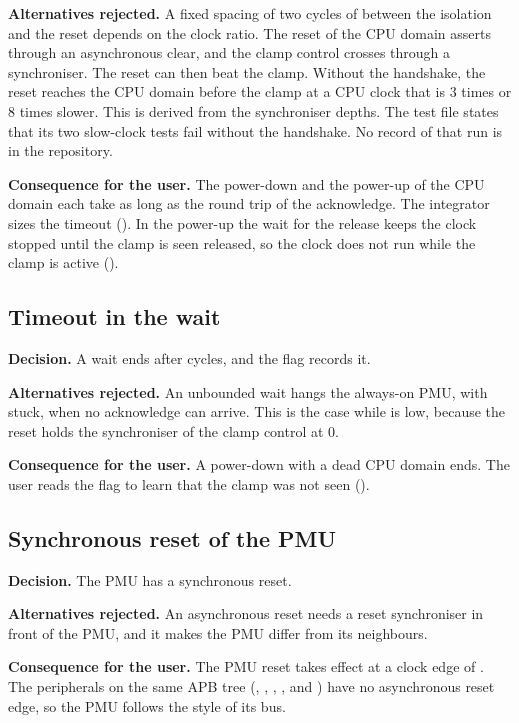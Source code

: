 \textbf{Alternatives rejected.} A fixed spacing of two cycles of  between the isolation and the reset depends on the clock ratio. The reset of the CPU domain asserts through an asynchronous clear, and the clamp control crosses through a synchroniser. The reset can then beat the clamp. Without the handshake, the reset reaches the CPU domain before the clamp at a CPU clock that is 3 times or 8 times slower. This is derived from the synchroniser depths. The test file states that its two slow-clock tests fail without the handshake. No record of that run is in the repository.

\textbf{Consequence for the user.} The power-down and the power-up of the CPU domain each take as long as the round trip of the acknowledge. The integrator sizes the timeout (). In the power-up the wait for the release keeps the clock stopped until the clamp is seen released, so the clock does not run while the clamp is active ().

\subsection{Timeout in the wait}\label{ds:ch:mod-power-management:dec-timeout}
\textbf{Decision.} A wait ends after  cycles, and the flag  records it.

\textbf{Alternatives rejected.} An unbounded wait hangs the always-on PMU, with  stuck, when no acknowledge can arrive. This is the case while  is low, because the reset holds the synchroniser of the clamp control at 0.

\textbf{Consequence for the user.} A power-down with a dead CPU domain ends. The user reads the flag to learn that the clamp was not seen ().

\subsection{Synchronous reset of the PMU}\label{ds:ch:mod-power-management:dec-reset}
\textbf{Decision.} The PMU has a synchronous reset.

\textbf{Alternatives rejected.} An asynchronous reset needs a reset synchroniser in front of the PMU, and it makes the PMU differ from its neighbours.

\textbf{Consequence for the user.} The PMU reset takes effect at a clock edge of . The peripherals on the same APB tree (, , , ,  and ) have no asynchronous reset edge, so the PMU follows the style of its bus.

